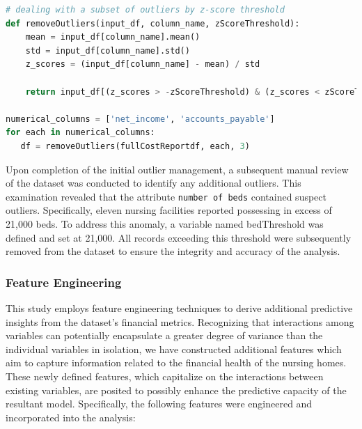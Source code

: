 \documentclass{article}
\theoremstyle{mytheoremstyle}
\theoremstyle{mytheoremstyle}
\theoremstyle{myproblemstyle}
\begin{document}
\begin{lstlisting}[language=Python, caption=Function to clean by z-score threshold]
# dealing with a subset of outliers by z-score threshold
def removeOutliers(input_df, column_name, zScoreThreshold):
    mean = input_df[column_name].mean()
    std = input_df[column_name].std()
    z_scores = (input_df[column_name] - mean) / std

    return input_df[(z_scores > -zScoreThreshold) & (z_scores < zScoreThreshold)]

numerical_columns = ['net_income', 'accounts_payable']
for each in numerical_columns:
   df = removeOutliers(fullCostReportdf, each, 3)
\end{lstlisting}

Upon completion of the initial outlier management, a subsequent manual review of the dataset was conducted to identify any additional outliers. This examination revealed that the attribute \texttt{number of beds} contained suspect outliers. Specifically, eleven nursing facilities reported possessing in excess of 21,000 beds. To address this anomaly, a variable named bedThreshold was defined and set at 21,000. All records exceeding this threshold were subsequently removed from the dataset to ensure the integrity and accuracy of the analysis.

\subsubsection{Feature Engineering}
This study employs feature engineering techniques to derive additional predictive insights from the dataset's financial metrics. Recognizing that interactions among variables can potentially encapsulate a greater degree of variance than the individual variables in isolation, we have constructed additional features which aim to capture information related to the financial health of the nursing homes. These newly defined features, which capitalize on the interactions between existing variables, are posited to possibly enhance the predictive capacity of the resultant model. Specifically, the following features were engineered and incorporated into the analysis:
\end{document}
